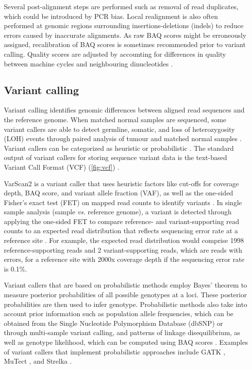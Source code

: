 Several post-alignment steps are performed such as removal of read duplicates, which could be introduced by PCR bias. Local realignment is also often performed at genomic regions surrounding insertions-deletions (indels) to reduce errors caused by inaccurate alignments. As raw BAQ scores might be erroneously assigned, recalibration of BAQ scores is sometimes recommended prior to variant calling. Quality scores are adjusted by accounting for differences in quality between machine cycles and neighbouring dinucleotides \cite{Bao2014, Mielczarek2016, Nielsen2011a, Oliver2015}.

\subsection{Variant calling}

Variant calling identifies genomic differences between aligned read sequences and the reference genome. When matched normal samples are sequenced, some variant callers are able to detect germline, somatic, and loss of heterozygosity (\acs{LOH}) events through paired analysis of tumour and matched normal samples \cite{Koboldt2013}. Variant callers can be categorized as heuristic or probabilistic \cite{Mielczarek2016, Pabinger2014, Bao2014}. The standard output of variant callers for storing sequence variant data is the text-based Variant Call Format (\acs{VCF}) (\autoref{fig:vcf}) \cite{Danecek2011}.

VarScan2 is a variant caller that uses heuristic factors like cut-offs for coverage depth, BAQ score, and variant allele fraction (\acs{VAF}), as well as the one-sided Fisher's exact test (\acs{FET}) on mapped read counts to identify variants \cite{Bao2014, Pabinger2014, Mielczarek2016, Koboldt2013, Koboldt2012}. In single sample analysis (sample \textit{vs.} reference genome), a variant is detected through applying the one-sided FET to compare reference- and variant-supporting read counts to an expected read distribution that reflects sequencing error rate at a reference site \cite{Koboldt2013, Koboldt2012}. For example, the expected read distribution would comprise 1998 reference-supporting reads and 2 variant-supporting reads, which are reads with errors, for a reference site with 2000x coverage depth if the sequencing error rate is 0.1\%.

Variant callers that are based on probabilistic methods employ Bayes' theorem to measure posterior probabilities of all possible genotypes at a loci. These posterior probabilities are then used to infer genotype. Probabilistic methods also take into account prior information such as population allele frequencies, which can be obtained from the Single Nucleotide Polymorphism Database (dbSNP) or through multi-sample variant calling, and patterns of linkage disequilibrium, as well as genotype likelihood, which can be computed using BAQ scores \cite{Mielczarek2016, Nielsen2011a}. Examples of variant callers that implement probabilistic approaches include GATK \cite{Schmidt2009}, MuTect \cite{Cibulskis2013}, and Strelka \cite{Saunders2012}.

